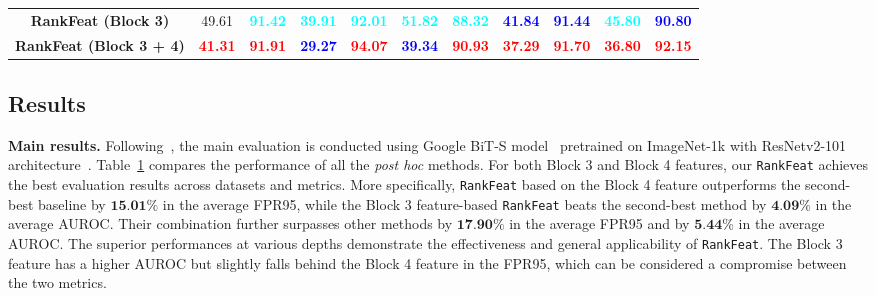 \begin{table}[htbp]
{\begin{tabular}{c|cc|cc|cc|cc|cc}
    \rowcolor{gray!20}\textbf{RankFeat (Block 3)} &{49.61} &\textbf{\textcolor{cyan}{91.42}} &\textbf{\textcolor{cyan}{39.91}} &\textbf{\textcolor{cyan}{92.01}} &\textbf{\textcolor{cyan}{51.82}} &\textbf{\textcolor{cyan}{88.32}} &\textbf{\textcolor{blue}{41.84}} &\textbf{\textcolor{blue}{91.44}} &\textbf{\textcolor{cyan}{45.80}} &\textbf{\textcolor{blue}{90.80}} \\
\rowcolor{gray!20} \textbf{RankFeat (Block 3 + 4)}
     &\textbf{\textcolor{red}{41.31}}&\textbf{\textcolor{red}{91.91}}&\textbf{\textcolor{blue}{29.27}}&\textbf{\textcolor{red}{94.07}}&\textbf{\textcolor{blue}{39.34}}&\textbf{\textcolor{red}{90.93}}&\textbf{\textcolor{red}{37.29}}&\textbf{\textcolor{red}{91.70}}&\textbf{\textcolor{red}{36.80}}&\textbf{\textcolor{red}{92.15}}\\
\bottomrule
    \end{tabular}
    }
    \label{tab:main_results_res101}
\end{table}

\subsection{Results}
\label{sec:exp_result}

\noindent \textbf{Main results.} Following~\cite{huang2021importance}, the main evaluation is conducted using Google BiT-S model~\cite{kolesnikov2020big} pretrained on ImageNet-1k with ResNetv2-101 architecture~\cite{he2016identity}. Table~\ref{tab:main_results_res101} compares the performance of all the \emph{post hoc} methods. For both Block 3 and Block 4 features, our \texttt{RankFeat} achieves the best evaluation results across datasets and metrics. More specifically, \texttt{RankFeat} based on the Block 4 feature outperforms the second-best baseline by $\textbf{15.01\%}$ in the average FPR95, while the Block 3 feature-based \texttt{RankFeat} beats the second-best method by $\textbf{4.09\%}$ in the average AUROC. Their combination further surpasses other methods by $\textbf{17.90\%}$ in the average FPR95 and by $\textbf{5.44\%}$ in the average AUROC. The superior performances at various depths demonstrate the effectiveness and general applicability of \texttt{RankFeat}. The Block 3 feature has a higher AUROC but slightly falls behind the Block 4 feature in the FPR95, which can be considered a compromise between the two metrics.





